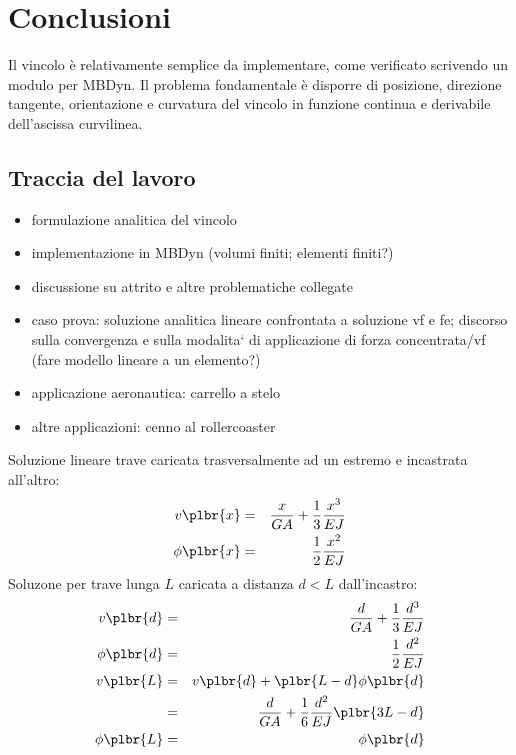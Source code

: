 \documentclass[12pt,dvips,fleqn,italian]{article}
\begin{document}
\section*{Conclusioni}
Il vincolo \`{e} relativamente semplice da implementare, come verificato
scrivendo un modulo per MBDyn. 
Il problema fondamentale \`{e} disporre di posizione, direzione tangente,
orientazione e curvatura del vincolo in funzione continua e derivabile
dell'ascissa curvilinea.






\pagebreak
\subsection*{Traccia del lavoro}

\begin{itemize}
\item formulazione analitica del vincolo
\item implementazione in MBDyn (volumi finiti; elementi finiti?)
\item discussione su attrito e altre problematiche collegate
\item caso prova: soluzione analitica lineare confrontata a soluzione vf e fe;
  discorso sulla convergenza e sulla modalita` di applicazione
  di forza concentrata/vf (fare modello lineare a un elemento?)
\item applicazione aeronautica: carrello a stelo
\item altre applicazioni: cenno al rollercoaster
\end{itemize}

\noindent
Soluzione lineare trave caricata trasversalmente ad un estremo e incastrata
all'altro:
\begin{eqnarray*}
	v\plbr{x} & = & \frac{x}{GA}+\frac{1}{3}\frac{x^3}{EJ} \\
	\phi\plbr{x} & = & \frac{1}{2}\frac{x^2}{EJ}
\end{eqnarray*}
Soluzone per trave lunga $L$ caricata a distanza $d<L$ dall'incastro:
\begin{eqnarray*}
	v\plbr{d} & = & \frac{d}{GA}+\frac{1}{3}\frac{d^3}{EJ} \\
	\phi\plbr{d} & = & \frac{1}{2}\frac{d^2}{EJ} \\
	v\plbr{L} & = & v\plbr{d} + \plbr{L-d}\phi\plbr{d} \\
	& = & \frac{d}{GA}+\frac{1}{6}\frac{d^2}{EJ}\plbr{3L - d} \\
	\phi\plbr{L} & = & \phi\plbr{d}
\end{eqnarray*}
\end{document}
